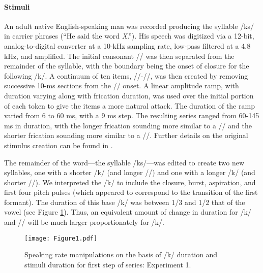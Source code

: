 \documentclass[preprint]{JASA}
\begin{document}
\paragraph{Stimuli}

An adult native English-speaking man was recorded producing the syllable /\textesh k\textscripta s/ in carrier phrases (“He said the word \textit{X}.”). His speech was digitized via a 12-bit, analog-to-digital converter at a 10-kHz sampling rate, low-pass filtered at a 4.8 kHz, and amplified. The initial consonant /\textesh/ was then separated from the remainder of the syllable, with the boundary being the onset of closure for the following /k/. A continuum of ten items, /\textesh/-/\textteshlig/, was then created by removing successive 10-ms sections from the /\textesh/ onset. A linear amplitude ramp, with duration varying along with frication duration, was used over the initial portion of each token to give the items a more natural attack. The duration of the ramp varied from 6 to 60 ms, with a 9 ms step. The resulting series ranged from 60-145 ms in duration, with the longer frication sounding more similar to a /\textesh/ and the shorter frication sounding more similar to a /\textteshlig/. Further details on the original stimulus creation can be found in \citet{newmanPerceptualNormalizationSpeaking1996}. 

The remainder of the word---the syllable /k\textscripta s/---was edited to create two new syllables, one with a shorter /k/ (and longer /\textscripta/) and one with a longer /k/ (and shorter /\textscripta/). We interpreted the /k/ to include the closure, burst, aspiration, and first four pitch pulses (which appeared to correspond to the transition of the first formant). The duration of this base /k/ was between 1/3 and 1/2 that of the vowel (see Figure \ref{fig:schema-exp1}). Thus, an equivalent amount of change in duration for /k/ and /\textscripta/ will be much larger proportionately for /k/. 

\begin{figure}
\centering
\texttt{[image: Figure1.pdf]}
\caption{\label{fig:schema-exp1}} Speaking rate manipulations on the basis of /k/ duration and stimuli duration for first step of series: Experiment 1. 
\end{figure}
\end{document}
